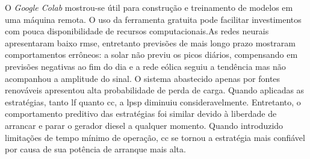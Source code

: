 O \emph{Google Colab} mostrou-se útil para construção e treinamento de modelos
em uma máquina remota.  O uso da ferramenta gratuita pode facilitar
investimentos com pouca disponibilidade de recursos computacionais.As redes
neurais apresentaram baixo \acrshort{rmse}, entretanto previsões de mais longo
prazo mostraram comportamentos errôneos: a solar não previu os picos diários,
compensando em previsões negativas ao fim do dia e a rede eólica seguiu a
tendência mas não acompanhou a amplitude do sinal.  O sistema abastecido apenas
por fontes renováveis apresentou alta probabilidade de perda de carga. Quando
aplicadas as estratégias, tanto \acrshort{lf} quanto \acrshort{cc}, a
\acrshort{lpsp} diminuiu consideravelmente.  Entretanto, o comportamento
preditivo das estratégias foi similar devido à liberdade de arrancar e parar o
gerador diesel a qualquer momento.  Quando introduzido limitações de tempo
mínimo de operação, \acrshort{cc} se tornou a estratégia mais confiável por
causa de sua potência de arranque mais alta.
